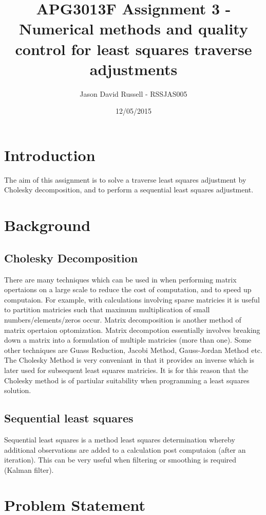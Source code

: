 \documentclass{article}
\title{APG3013F Assignment 3 - Numerical methods and quality control for least squares traverse adjustments}
\date{12/05/2015}
\author{Jason David Russell - RSSJAS005}
\begin{document}
\maketitle
{}

\newpage
\tableofcontents


\newpage
\section{Introduction}
The aim of this assignment is to solve a traverse least squares adjustment by Cholesky decomposition,
and to perform a sequential least squares adjustment.

\section{Background}
\subsection{Cholesky Decomposition}
There are many techniques which can be used in when performing matrix opertaions on a large scale to 
reduce the cost of computation, and to speed up computaion. For example, with calculations involving sparse 
matricies it is useful to partition matricies such that maximum multiplication of small numbers/elements/zeros
occur. Matrix decomposition is another method of matrix opertaion optomization. Matrix decompotion essentially
involves breaking down a matrix into a formulation of multiple matricies (more than one). Some other techniques are
Guass Reduction, Jacobi Method, Gauss-Jordan Method etc. The Cholesky Method is very conveniant in that 
it provides an inverse which is later used for subsequent least squares matricies. It is for this reason that
the Cholesky method is of partiular suitability when programming a least squares solution.

\subsection{Sequential least squares}
Sequential least squares is a method least squares determination whereby additional observations
are added to a calculation post computaion (after an iteration). This can be very useful when filtering or smoothing
is required (Kalman filter).

\section{Problem Statement}
\end{document}

